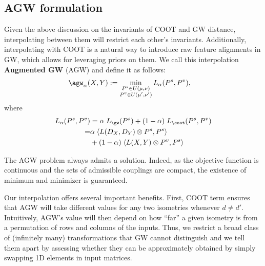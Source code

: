 \subsection{AGW formulation} \label{subsec:agw_formulation}
Given the above discussion on the invariants of COOT and GW distance,
interpolating between them will restrict each other's invariants. Additionally,
interpolating with COOT is a natural way to introduce raw feature alignments in GW,
which allows for leveraging priors on them.
We call this interpolation \textbf{Augmented GW} (AGW) and define it as follows:
\begin{align}
\label{eq:scootr}
\agw_{\alpha}(X, Y) &:=
\min_{\substack{P^s \in U(\mu,\nu) \\ P^v \in U(\mu',\nu')}} L_{\alpha}(P^s, P^v),
\end{align}
where
\begin{align*}
    L_{\alpha}(P^s, P^v) &= \alpha \; L_{\gw} (P^s) + (1-\alpha) \; L_{\coot} (P^s, P^v) \\
    =& \alpha \; \langle L(D_X,D_Y)\otimes P^s,P^s \rangle \\
    &+ (1-\alpha) \; \langle L(X,Y) \otimes P^v,P^s \rangle
\end{align*}

The AGW problem always admits a solution. Indeed, as the objective function is continuous
and the sets of admissible couplings are compact, the existence of minimum and minimizer
is guaranteed.

Our interpolation offers several important benefits. First, COOT term ensures that AGW
will take different values for any two isometries whenever $d \neq d'$. Intuitively,
AGW's value will then depend on how ``far'' a given isometry is from a permutation of rows
and columns of the inputs. Thus, we restrict a broad class of (infinitely many) transformations
that GW cannot distinguish and we tell them apart by assessing whether they
can be approximately obtained by simply swapping 1D elements in input matrices.

